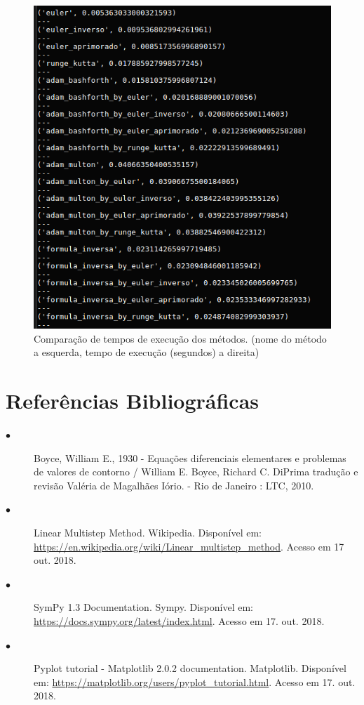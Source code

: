 \documentclass{article}
\begin{document}
\begin{otherlanguage}{brazil}
    \begin{figure}[!htbp] 
      \includegraphics[width=\linewidth]{pic1.png}
      \caption{Comparação de tempos de execução dos métodos. (nome do método a esquerda, tempo de execução (segundos) a direita)}
      \label{fig:pic1}
    \end{figure}
\newpage
\section{Referências Bibliográficas}
        \begin{description}
          \item[$\bullet$] {Boyce, William E., 1930 - Equações diferenciais elementares e problemas de valores de contorno / William E. Boyce,
Richard C. DiPrima tradução e revisão Valéria de Magalhães Iório. - Rio de Janeiro :
LTC, 2010.}
          \item[$\bullet$] {Linear Multistep Method. Wikipedia. Disponível em:  \url{https://en.wikipedia.org/wiki/Linear\_multistep\_method}. Acesso em 17 out. 2018.}
          \item[$\bullet$] {SymPy 1.3 Documentation. Sympy. Disponível em: \url{https://docs.sympy.org/latest/index.html}. Acesso em 17. out. 2018.}
          \item[$\bullet$] {Pyplot tutorial - Matplotlib 2.0.2 documentation. Matplotlib. Disponível em: \url{https://matplotlib.org/users/pyplot_tutorial.html}. Acesso em 17. out. 2018.}
        \end{description}
\end{otherlanguage}
\end{document}
